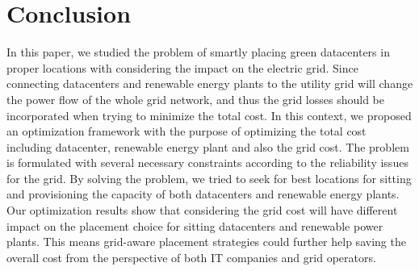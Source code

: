 \section{Conclusion}
\label{sec:conclusion}

In this paper, we studied the problem of smartly placing green datacenters in proper locations with considering the impact on the electric grid. Since connecting datacenters and renewable energy plants to the utility grid will change the power flow of the whole grid network, and thus the grid losses should be incorporated when trying to minimize the total cost. In this context, we proposed an optimization framework with the purpose of optimizing the total cost including datacenter, renewable energy plant and also the grid cost. The problem is formulated with several necessary constraints according to the reliability issues for the grid. By solving the problem, we tried to seek for best locations for sitting and provisioning the capacity of both datacenters and renewable energy plants. Our optimization results show that considering the grid cost will have different impact on the placement choice for sitting datacenters and renewable power plants. This means grid-aware placement strategies could further help saving the overall cost from the perspective of both IT companies and grid operators.

